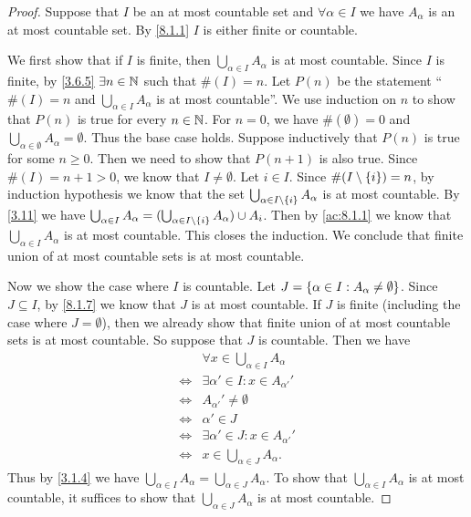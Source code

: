\begin{proof}
  Suppose that \(I\) be an at most countable set and \(\forall \alpha \in I\) we have \(A_{\alpha}\) is an at most countable set.
  By \cref{8.1.1} \(I\) is either finite or countable.

  We first show that if \(I\) is finite, then \(\bigcup_{\alpha \in I} A_{\alpha}\) is at most countable.
  Since \(I\) is finite, by \cref{3.6.5} \(\exists n \in \mathbb{N}\) such that \(\#(I) = n\).
  Let \(P(n)\) be the statement ``\(\#(I) = n\) and \(\bigcup_{\alpha \in I} A_{\alpha}\) is at most countable''.
  We use induction on \(n\) to show that \(P(n)\) is true for every \(n \in \mathbb{N}\).
  For \(n = 0\), we have \(\#(\emptyset) = 0\) and \(\bigcup_{\alpha \in \emptyset} A_{\alpha} = \emptyset\).
  Thus the base case holds.
  Suppose inductively that \(P(n)\) is true for some \(n \geq 0\).
  Then we need to show that \(P(n + 1)\) is also true.
  Since \(\#(I) = n + 1 > 0\), we know that \(I \neq \emptyset\).
  Let \(i \in I\).
  Since \(\#(I \setminus \left\lbrace i\right\rbrace) = n\), by induction hypothesis we know that the set \(\bigcup_{\alpha \in I \setminus \left\lbrace i\right\rbrace} A_{\alpha}\) is at most countable.
  By \cref{3.11} we have \(\bigcup_{\alpha \in I} A_{\alpha} = (\bigcup_{\alpha \in I \setminus \left\lbrace i\right\rbrace} A_{\alpha}) \cup A_i\).
  Then by \cref{ac:8.1.1} we know that \(\bigcup_{\alpha \in I} A_{\alpha}\) is at most countable.
  This closes the induction.
  We conclude that finite union of at most countable sets is at most countable.

  Now we show the case where \(I\) is countable.
  Let \(J = \left\lbrace\alpha \in I : A_{\alpha} \neq \emptyset\right\rbrace\).
  Since \(J \subseteq I\), by \cref{8.1.7} we know that \(J\) is at most countable.
  If \(J\) is finite (including the case where \(J = \emptyset\)), then we already show that finite union of at most countable sets is at most countable.
  So suppose that \(J\) is countable.
  Then we have
  \begin{align*}
         & \forall x \in \bigcup_{\alpha \in I} A_{\alpha} \\
    \iff & \exists \alpha' \in I : x \in A_{\alpha'}'      \\
    \iff & A_{\alpha'}' \neq \emptyset                     \\
    \iff & \alpha' \in J                                   \\
    \iff & \exists \alpha' \in J : x \in A_{\alpha'}'      \\
    \iff & x \in \bigcup_{\alpha \in J} A_{\alpha}.
  \end{align*}
  Thus by \cref{3.1.4} we have \(\bigcup_{\alpha \in I} A_{\alpha} = \bigcup_{\alpha \in J} A_{\alpha}\).
  To show that \(\bigcup_{\alpha \in I} A_{\alpha}\) is at most countable, it suffices to show that \(\bigcup_{\alpha \in J} A_{\alpha}\) is at most countable.


\end{proof}
